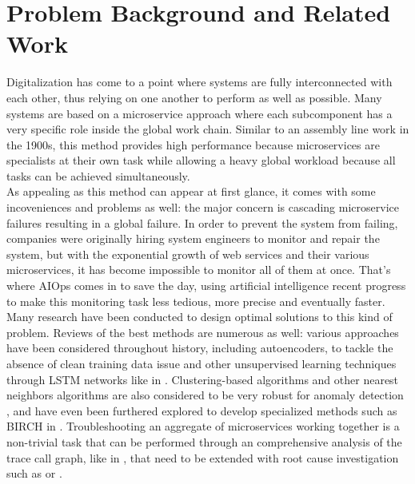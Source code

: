 \documentclass[acmsmall, screen, nonacm]{acmart}
\begin{document}
\section{Problem Background and Related Work}
Digitalization has come to a point where systems are fully interconnected with each other, thus relying on one another to perform as well as possible. 
Many systems are based on a microservice approach where each subcomponent has a very specific role inside the global work chain. 
Similar to an assembly line work in the 1900s, this method provides high performance because microservices are specialists at their own task while allowing a heavy global workload because all tasks can be achieved simultaneously.
\\
As appealing as this method can appear at first glance, it comes with some incoveniences and problems as well: the major concern is cascading microservice failures resulting in a global failure. 
In order to prevent the system from failing, companies were originally hiring system engineers to monitor and repair the system, but with the exponential growth of web services and their various microservices, it has become impossible to monitor all of them at once. 
That's where AIOps comes in to save the day, using artificial intelligence recent progress to make this monitoring task less tedious, more precise and eventually faster.
\\
Many research have been conducted to design optimal solutions to this kind of problem. Reviews of the best methods are numerous as well:  various approaches have been considered throughout history, including autoencoders, to tackle the absence of clean training data issue \cite{zhou_anomaly_2017} and other unsupervised learning techniques through LSTM networks like in \cite{nedelkoski_anomaly_2019}.
Clustering-based algorithms and other nearest neighbors algorithms are also considered to be very robust for anomaly detection \cite{chandola_anomaly_2009}, and have even been furthered explored to develop specialized methods such as BIRCH in \cite{gulenko_detecting_2018}. 
Troubleshooting an aggregate of microservices working together is a non-trivial task that can be performed through an comprehensive analysis of the trace call graph, like in \cite{manzoor_fast_2016}, that need to be extended with root cause investigation such as \cite{weng_root_2018} or \cite{yan_g-rca_2012}. 
\end{document}
